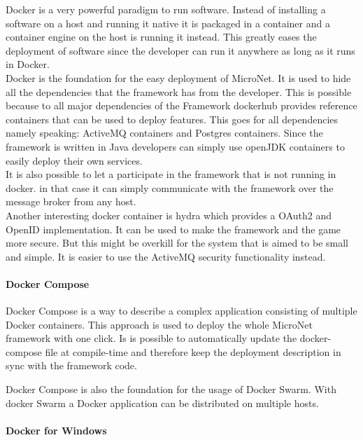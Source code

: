 Docker is a very powerful paradigm to run software. Instead of installing a
software on a host and running it native it is packaged in a container and a
container engine on the host is running it instead. This greatly eases the
deployment of software since the developer can run it anywhere as long as it
runs in Docker.\\

Docker is the foundation for the easy deployment of MicroNet. It is used to hide
all the dependencies that the framework has from the developer. This is possible
because to all major dependencies of the Framework dockerhub provides reference
containers that can be used to deploy features. This goes for all dependencies
namely speaking: ActiveMQ containers and Postgres containers. Since the
framework is written in Java developers can simply use openJDK containers to
easily deploy their own services.\\

It is also possible to let a \ms{} participate in the framework that is not
running in docker. in that case it can simply communicate with the framework
over the message broker from any host.\\

Another interesting docker container is hydra which provides a OAuth2 and
OpenID implementation. It can be used to make the framework and the game more
secure. But this might be overkill for the system that is aimed to be small and
simple. It is easier to use the ActiveMQ security functionality instead.\\

\paragraph{Docker Compose}

Docker Compose is a way to describe a complex application consisting of multiple
Docker containers. This approach is used to deploy the whole MicroNet framework
with one click. Is is possible to automatically update the docker-compose file
at compile-time and therefore keep the deployment description in sync with the
framework code.

Docker Compose is also the foundation for the usage of Docker Swarm. With docker
Swarm a Docker application can be distributed on multiple hosts. 

\paragraph{Docker for Windows}

